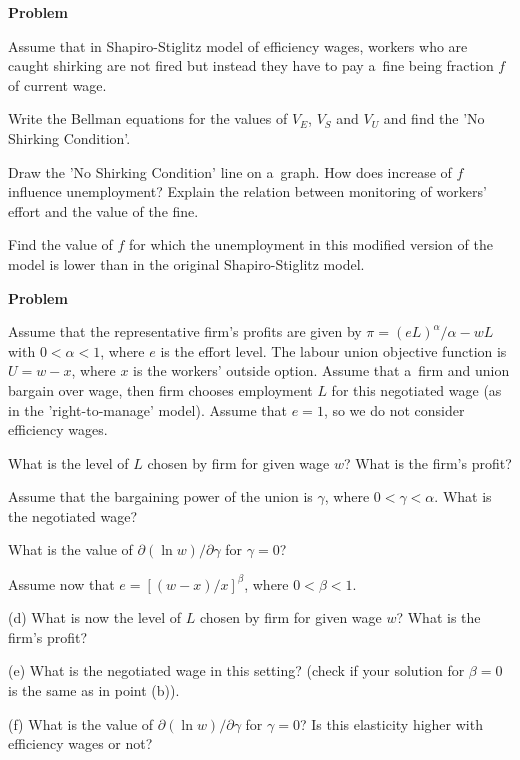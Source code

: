 \documentclass[a4paper, notitlepage, 11pt]{article}
\newcounter{zadlicz}[section]%
\newcommand{\tytul}[2]{\setcounter{equation}{0}\addtocounter{zadlicz}{1}\vspace{\abovedisplayskip}\noindent\textbf{#1\ \thezadlicz #2}}%
\begin{document}
\tytul{Problem}{}

\noindent%
Assume that in Shapiro-Stiglitz model of efficiency wages, workers who are caught shirking are not fired but instead they have to pay a~fine being fraction $f$ of current wage.

\begin{wylicz}
\item Write the Bellman equations for the values of $V_E$, $V_S$ and $V_U$ and find the 'No Shirking Condition'.
\item Draw the 'No Shirking Condition' line on a~graph. How does increase of $f$ influence unemployment? Explain the relation between monitoring of workers' effort and the value of the fine.
\item Find the value of $f$ for which the unemployment in this modified version of the model is lower than in the original Shapiro-Stiglitz model.
\end{wylicz}


\tytul{Problem}{}

\noindent%
Assume that the representative firm's profits are given by $\pi=(eL)^\alpha/\alpha-wL$ with $0<\alpha<1$, where $e$ is the effort level. The labour union objective function is $U=w-x$, where $x$ is the workers' outside option. Assume that a~firm and union bargain over wage, then firm chooses employment $L$ for this negotiated wage (as in the 'right-to-manage' model). Assume that $e=1$, so we do not consider efficiency wages.

\begin{wylicz}
 \item What is the level of $L$ chosen by firm for given wage $w$? What is the firm's profit?
 \item Assume that the bargaining power of the union is $\gamma$, where $0<\gamma<\alpha$. What is the negotiated wage?
 \item What is the value of $\partial (\ln w)/\partial\gamma$ for $\gamma=0$?
\end{wylicz}

Assume now that $e=[(w-x)/x]^\beta$, where $0<\beta<1$.

\begin{wylicz}
 \item[(d)] What is now the level of $L$ chosen by firm for given wage $w$? What is the firm's profit?
 \item[(e)] What is the negotiated wage in this setting? (check if your solution for $\beta=0$ is the same as in point (b)).
 \item[(f)] What is the value of $\partial (\ln w)/\partial\gamma$ for $\gamma=0$? Is this elasticity higher with efficiency wages or not?
\end{wylicz}
\end{document}
